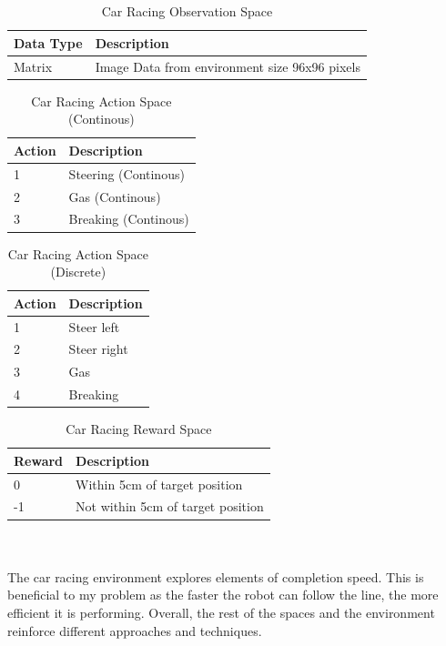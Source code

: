 \documentclass[a4paper,12pt]{article}
\begin{document}
\\\\
\begin{table}[H]
\centering
\caption{Car Racing Observation Space}
\label{tab:Car Racing Observation Space}
\begin{tabular}{|ll|}
\hline
\textbf{Data Type} & \textbf{Description}\\ \hline
Matrix & Image Data from environment size 96x96 pixels\\ \hline
\end{tabular}
\end{table}

\begin{table}[H]
\centering
\caption{Car Racing Action Space (Continous)}
\label{tab:Car Racing Action Space (Continous)}
\begin{tabular}{|ll|}
\hline
\textbf{Action} & \textbf{Description}\\ \hline
1 & Steering (Continous)\\ 
2 & Gas (Continous)\\ 
3 & Breaking (Continous)\\ \hline
\end{tabular}

\end{table}
\begin{table}[H]
\centering
\caption{Car Racing Action Space (Discrete)}
\label{tab:Car Racing Action Space (Discrete)}
\begin{tabular}{|ll|}
\hline
\textbf{Action} & \textbf{Description}\\ \hline
1 & Steer left \\ 
2 & Steer right \\ 
3 & Gas \\ 
4 & Breaking \\ \hline
\end{tabular}
\end{table}

\begin{table}[H]
\centering
\caption{Car Racing Reward Space}
\label{tab:Car Racing Reward Space}
\begin{tabular}{|ll|}
\hline
\textbf{Reward} & \textbf{Description}\\ \hline
0 & Within 5cm of target position\\ 
-1 & Not within 5cm of target position \\ \hline
\end{tabular}
\end{table}
\\\\
The car racing environment explores elements of completion speed. This is beneficial to my problem as the faster the robot can follow the line, the more efficient it is performing. Overall, the rest of the spaces and the environment reinforce different approaches and techniques. 
\end{document}
